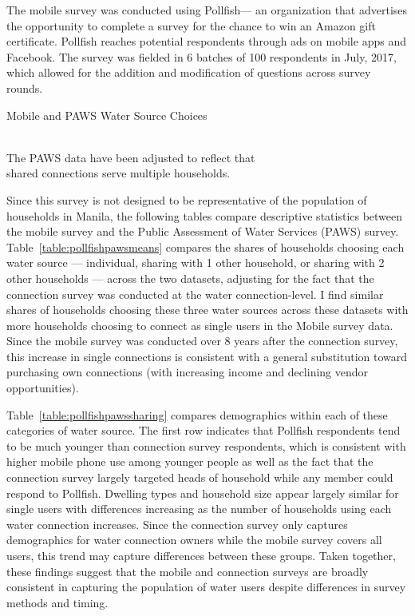 \documentclass[12pt]{article}
\begin{document}
\begin{appendices}
The mobile survey was conducted using Pollfish--- an organization that advertises the opportunity to complete a survey for the chance to win an Amazon gift certificate.  Pollfish reaches potential respondents through ads on mobile apps and Facebook.  The survey was fielded in 6 batches of 100 respondents in July, 2017, which allowed for the addition and modification of questions across survey rounds.  

\begin{table}
\centering
\caption{Mobile and PAWS Water Source Choices}\label{table:pollfishpawsmeans}
 \\
\vspace{.3cm}
\footnotesize{The PAWS data have been adjusted to reflect that \\ shared connections serve multiple households.}
\end{table}

Since this survey is not designed to be representative of the population of households in Manila, the following tables compare descriptive statistics between the mobile survey and the Public Assessment of Water Services (PAWS) survey.  Table~\ref{table:pollfishpawsmeans} compares the shares of households choosing each water source --- individual, sharing with 1 other household, or sharing with 2 other households --- across the two datasets, adjusting for the fact that the connection survey was conducted at the water connection-level.  I find similar shares of households choosing these three water sources across these datasets with more households choosing to connect as single users in the Mobile survey data.  Since the mobile survey was conducted over 8 years after the connection survey, this increase in single connections is consistent with a general substitution toward purchasing own connections (with increasing income and declining vendor opportunities).

Table~\ref{table:pollfishpawssharing} compares demographics within each of these categories of water source.  The first row indicates that Pollfish respondents tend to be much younger than connection survey respondents, which is consistent with higher mobile phone use among younger people as well as the fact that the connection survey largely targeted heads of household while any member could respond to Pollfish.  Dwelling types and household size appear largely similar for single users with differences increasing as the number of households using each water connection increases.  Since the connection survey only captures demographics for water connection owners while the mobile survey covers all users, this trend may capture differences between these groups.  Taken together, these findings suggest that the mobile and connection surveys are broadly consistent in capturing the population of water users despite differences in survey methods and timing.


\end{appendices}
\end{document}
